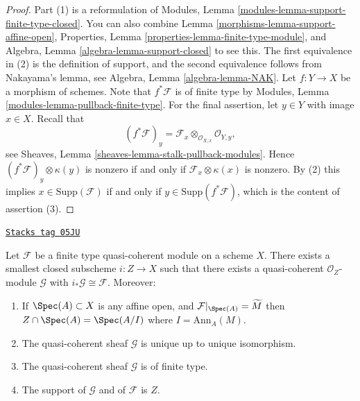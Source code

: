 \begin{proof}

Part (1) is a reformulation of
Modules, Lemma \ref{modules-lemma-support-finite-type-closed}.
You can also combine
Lemma \ref{morphisms-lemma-support-affine-open},
Properties, Lemma \ref{properties-lemma-finite-type-module},
and
Algebra, Lemma \ref{algebra-lemma-support-closed}
to see this. The first equivalence in (2) is the definition
of support, and the second equivalence follows from
Nakayama's lemma, see
Algebra, Lemma \ref{algebra-lemma-NAK}.
Let $f : Y \to X$ be a morphism of schemes. Note that
$f^*\mathcal{F}$ is of finite type by
Modules, Lemma \ref{modules-lemma-pullback-finite-type}.
For the final assertion, let $y \in Y$ with image $x \in X$.
Recall that
$$
(f^*\mathcal{F})_y =
\mathcal{F}_x \otimes_{\mathcal{O}_{X, x}} \mathcal{O}_{Y, y},
$$
see
Sheaves, Lemma \ref{sheaves-lemma-stalk-pullback-modules}.
Hence $(f^*\mathcal{F})_y \otimes \kappa(y)$ is nonzero
if and only if $\mathcal{F}_x \otimes \kappa(x)$ is nonzero.
By (2) this implies $x \in \text{Supp}(\mathcal{F})$ if and only
if $y \in \text{Supp}(f^*\mathcal{F})$, which is the content of
assertion (3).
\end{proof}

\begin{lemma}
\label{morphisms-lemma-scheme-theoretic-support}
\href{https://stacks.math.columbia.edu/tag/05JU}{\texttt{Stacks tag 05JU}}

Let $\mathcal{F}$ be a finite type quasi-coherent module
on a scheme $X$. There exists a smallest closed subscheme
$i : Z \to X$ such that there exists a quasi-coherent
$\mathcal{O}_Z$-module $\mathcal{G}$ with
$i_*\mathcal{G} \cong \mathcal{F}$. Moreover:
\begin{enumerate}
\item If $\Spec(A) \subset X$ is any affine open, and
$\mathcal{F}|_{\Spec(A)} = \widetilde{M}$ then
$Z \cap \Spec(A) = \Spec(A/I)$ where $I = \text{Ann}_A(M)$.
\item The quasi-coherent sheaf $\mathcal{G}$ is unique up to unique
isomorphism.
\item The quasi-coherent sheaf $\mathcal{G}$ is of finite type.
\item The support of $\mathcal{G}$ and of $\mathcal{F}$ is $Z$.
\end{enumerate}
\end{lemma}

